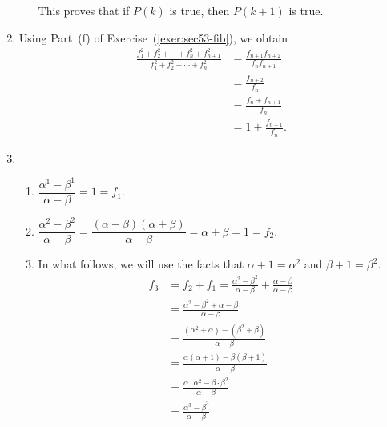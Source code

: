 \begin{enumerate}
\begin{enumerate}
This proves that if $P \left( k \right)$ is true, then $P \left( k + 1\right)$ is true.
\end{enumerate}



\item Using Part~(f) of Exercise~(\ref{exer:sec53-fib}), we obtain
\begin{align*}
\frac{f_1^2  + f_2^2  +  \cdots  + f_n^2 + f_{n+1}^2}{f_1^2  + f_2^2  +  \cdots  + f_n^2}  &= 
\frac{f_{n+1}f_{n+2}}{f_n f_{n + 1}}  \\
  &= \frac{f_{n+2}}{f_n} \\
  &= \frac{f_{n} + f_{n+1}}{f_n} \\
  &= 1 + \frac{f_{n+1}}{f_n}.
\end{align*}



\item \begin{enumerate}
\item $\dfrac{\alpha^1 - \beta^1}{\alpha - \beta} = 1 = f_1$.

\item $\dfrac{\alpha^2 - \beta^2}{\alpha - \beta} = \dfrac{( \alpha - \beta)( \alpha + \beta )}{\alpha - \beta} = \alpha + \beta = 1 = f_2$.

\item  In what follows, we will use the facts that $\alpha + 1 = \alpha^2$ and $\beta + 1 = \beta^2$.
\begin{align*}
f_3 &= f_2 + f_1 = \frac{\alpha^2 - \beta^2}{\alpha - \beta} + \frac{\alpha - \beta}{\alpha - \beta} \\
    &= \frac{\alpha^2 - \beta^2 + \alpha - \beta}{\alpha - \beta} \\
    &= \frac{\left( \alpha^2 + \alpha \right) - \left(\beta^2 + \beta \right)}{\alpha - \beta} \\
    &= \frac{ \alpha(\alpha + 1) - \beta(\beta + 1)}{\alpha - \beta} \\
    &= \frac{\alpha \cdot \alpha^2 - \beta \cdot \beta^2}{ \alpha - \beta} \\
    &= \frac{\alpha^3 - \beta^3}{\alpha - \beta}
\end{align*}


\end{enumerate}
\end{enumerate}
